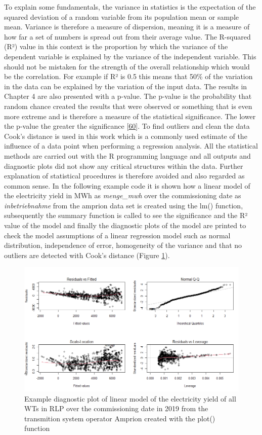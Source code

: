 \documentclass[a4paper,11pt]{article}
\begin{document}
To explain some fundamentals, the variance in statistics is the expectation of the squared deviation of a random variable from its population mean or sample mean. Variance is therefore a measure of dispersion, meaning it is a measure of how far a set of numbers is spread out from their average value. The R-squared (R²) value in this context is the proportion by which the variance of the dependent variable is explained by the variance of the independent variable. This should not be mistaken for the strength of the overall relationship which would be the correlation. For example if R² is 0.5 this means that 50\% of the variation in the data can be explained by the variation of the input data. The results in Chapter 4 are also presented with a p-value. The p-value is the probability that random chance created the results that were observed or something that is even more extreme and is therefore a measure of the statistical significance. The lower the p-value the greater the significance {[}\protect\hyperlink{ref-LeoH.Kahane.2006}{60}{]}. To find outliers and clean the data Cook's distance is used in this work which is a commonly used estimate of the influence of a data point when performing a regression analysis. All the statistical methods are carried out with the R programming language and all outputs and diagnostic plots did not show any critical structures within the data. Further explanation of statistical procedures is therefore avoided and also regarded as common sense. In the following example code it is shown how a linear model of the electricity yield in MWh as \emph{menge\_mwh} over the commissioning date as \emph{inbetriebnahme} from the amprion data set is created using the lm() function, subsequently the summary function is called to see the significance and the R² value of the model and finally the diagnostic plots of the model are printed to check the model assumptions of a linear regression model such as normal distribution, independence of error, homogeneity of the variance and that no outliers are detected with Cook's distance (Figure \ref{fig:diagnostics}).
\begin{figure}[H]

{\centering \includegraphics[width=1\linewidth]{figures/diagnostics} 

}

\caption{Example diagnostic plot of linear model of the electricity yield of all WTs in RLP over the commissioning date in 2019 from the transmition system operator Amprion created with the plot() function}\label{fig:diagnostics}
\end{figure}
\end{document}
